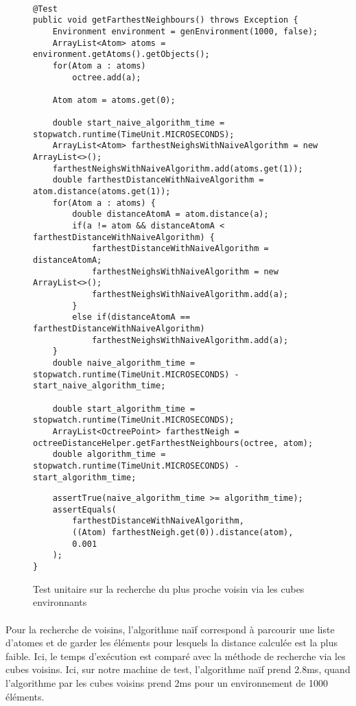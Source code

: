 \paragraph{}
\begin{figure}[H]
\begin{lstlisting}
@Test
public void getFarthestNeighbours() throws Exception {
    Environment environment = genEnvironment(1000, false);
    ArrayList<Atom> atoms = environment.getAtoms().getObjects();
    for(Atom a : atoms)
        octree.add(a);

    Atom atom = atoms.get(0);

    double start_naive_algorithm_time = stopwatch.runtime(TimeUnit.MICROSECONDS);
    ArrayList<Atom> farthestNeighsWithNaiveAlgorithm = new ArrayList<>();
    farthestNeighsWithNaiveAlgorithm.add(atoms.get(1));
    double farthestDistanceWithNaiveAlgorithm = atom.distance(atoms.get(1));
    for(Atom a : atoms) {
        double distanceAtomA = atom.distance(a);
        if(a != atom && distanceAtomA < farthestDistanceWithNaiveAlgorithm) {
            farthestDistanceWithNaiveAlgorithm = distanceAtomA;
            farthestNeighsWithNaiveAlgorithm = new ArrayList<>();
            farthestNeighsWithNaiveAlgorithm.add(a);
        }
        else if(distanceAtomA == farthestDistanceWithNaiveAlgorithm)
            farthestNeighsWithNaiveAlgorithm.add(a);
    }
    double naive_algorithm_time = stopwatch.runtime(TimeUnit.MICROSECONDS) - start_naive_algorithm_time;

    double start_algorithm_time = stopwatch.runtime(TimeUnit.MICROSECONDS);
    ArrayList<OctreePoint> farthestNeigh = octreeDistanceHelper.getFarthestNeighbours(octree, atom);
    double algorithm_time = stopwatch.runtime(TimeUnit.MICROSECONDS) - start_algorithm_time;
\end{lstlisting}
\end{figure}
\begin{figure}[H]
\begin{lstlisting}
    assertTrue(naive_algorithm_time >= algorithm_time);
    assertEquals(
        farthestDistanceWithNaiveAlgorithm,
        ((Atom) farthestNeigh.get(0)).distance(atom),
        0.001
    );
}
\end{lstlisting}
\caption{Test unitaire sur la recherche du plus proche voisin via les cubes
    environnants}
\label{octree_getFarthestNeighbours}
\end{figure}

\paragraph{}
Pour la recherche de voisins, l'algorithme naïf correspond à parcourir une
liste d'atomes et de garder les éléments pour lesquels la distance calculée est
la plus faible. Ici, le temps d'exécution est comparé avec la méthode de
recherche via les cubes voisins. Ici, sur notre machine de test, l'algorithme
naïf prend 2.8ms, quand l'algorithme par les cubes voisins prend 2ms pour un
environnement de 1000 éléments.

